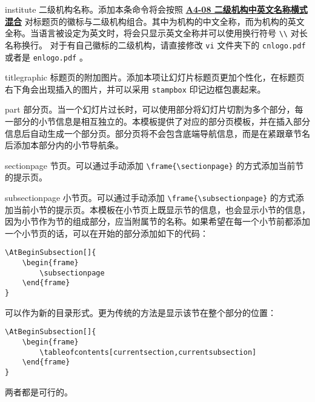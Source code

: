 \documentclass[a4paper,12pt]{article}
\begin{document}
\begin{CJK}{UTF8}{song}
\begin{docCommand*}[]{institute}{}
    二级机构名称。添加本条命令将会按照 \href{https://vi.sjtu.edu.cn/index.php/articles/base/4}{\textbf{A4-08 二级机构中英文名称横式混合}} 对标题页的徽标与二级机构组合。其中为机构的中文全称，而为机构的英文全称。当语言被设定为英文时，将会只显示英文全称并可以使用换行符号 \verb"\\" 对长名称换行。
    对于有自己徽标的二级机构，请直接修改 \verb"vi" 文件夹下的 \verb"cnlogo.pdf" 或者是 \verb"enlogo.pdf" 。
\end{docCommand*}

\begin{docCommand*}[]{titlegraphic}{}
    标题页的附加图片。添加本项让幻灯片标题页更加个性化，在标题页右下角会出现插入的图片，并可以采用 \verb"stampbox" 印记边框包裹起来。
\end{docCommand*}

\begin{docCommand*}[]{part}{}
    部分页。当一个幻灯片过长时，可以使用部分将幻灯片切割为多个部分，每一部分的小节信息是相互独立的。本模板提供了对应的部分页模板，并在插入部分信息后自动生成一个部分页。部分页将不会包含底端导航信息，而是在紧跟章节名后添加本部分内的小节导航条。
\end{docCommand*}

\begin{docCommand*}[]{sectionpage}{}
    节页。可以通过手动添加 \verb"\frame{\sectionpage}" 的方式添加当前节的提示页。
\end{docCommand*}

\begin{docCommand*}[]{subsectionpage}{}
    小节页。可以通过手动添加 \verb"\frame{\subsectionpage}" 的方式添加当前小节的提示页。本模板在小节页上既显示节的信息，也会显示小节的信息，因为小节作为节的组成部分，应当附属节的名称。如果希望在每一个小节前都添加一个小节页的话，可以在开始的部分添加如下的代码：
    \begin{verbatim}
\AtBeginSubsection[]{
    \begin{frame}
        \subsectionpage
    \end{frame}
}\end{verbatim}
    可以作为新的目录形式。更为传统的方法是显示该节在整个部分的位置：
    \begin{verbatim}
\AtBeginSubsection[]{
    \begin{frame}
        \tableofcontents[currentsection,currentsubsection]
    \end{frame}
}\end{verbatim}
    两者都是可行的。
\end{docCommand*}


\end{CJK}
\end{document}
